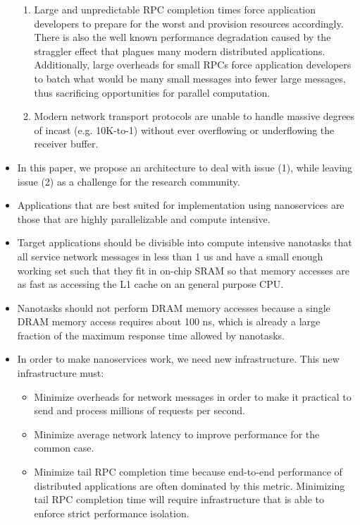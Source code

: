 \begin{itemize}
    \begin{enumerate}
        \item Large and unpredictable RPC completion times force application developers to prepare for the worst and provision resources accordingly. There is also the well known performance degradation caused by the straggler effect that plagues many modern distributed applications. Additionally, large overheads for small RPCs force application developers to batch what would be many small messages into fewer large messages, thus sacrificing opportunities for parallel computation.
        \item Modern network transport protocols are unable to handle massive degrees of incast (e.g. 10K-to-1) without ever overflowing or underflowing the receiver buffer.
    \end{enumerate}
    \item In this paper, we propose an architecture to deal with issue (1), while leaving issue (2) as a challenge for the research community.
    \item Applications that are best suited for implementation using nanoservices are those that are highly parallelizable and compute intensive.
    \item Target applications should be divisible into compute intensive nanotasks that all service network messages in less than 1 us and have a small enough working set such that they fit in on-chip SRAM so that memory accesses are as fast as accessing the L1 cache on an general purpose CPU. 
    \item Nanotasks should not perform DRAM memory accesses because a single DRAM memory access requires about 100 ns, which is already a large fraction of the maximum response time allowed by nanotasks.
    \item In order to make nanoservices work, we need new infrastructure. This new infrastructure must:
    \begin{itemize}
        \item Minimize overheads for network messages in order to make it practical to send and process millions of requests per second.
        \item Minimize average network latency to improve performance for the common case.
        \item Minimize tail RPC completion time because end-to-end performance of distributed applications are often dominated by this metric. Minimizing tail RPC completion time will require infrastructure that is able to enforce strict performance isolation.
    \end{itemize}
\end{itemize}
